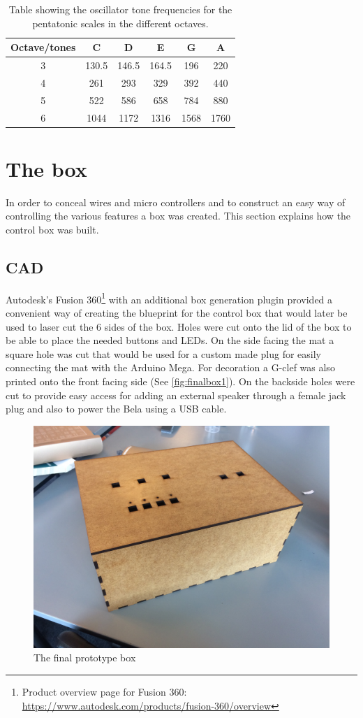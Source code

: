 	\begin{table}[H]
		\centering
		\caption{Table showing the oscillator tone frequencies for the pentatonic scales in the different octaves.}
		\label{tab:toneFreq}
		\begin{tabular}{|c|c|c|c|c|c|}
			\hline
			Octave/tones & C     & D     & E     & G    & A    \\ \hline
			3            & 130.5 & 146.5 & 164.5 & 196  & 220  \\ \hline
			4            & 261   & 293   & 329   & 392  & 440  \\ \hline
			5            & 522   & 586   & 658   & 784  & 880  \\ \hline
			6            & 1044  & 1172  & 1316  & 1568 & 1760 \\ \hline
		\end{tabular}
	\end{table}
	



\section{The box}%
In order to conceal wires and micro controllers and to construct an easy way of controlling the various features a box was created. This section explains how the control box was built.

	\subsection{CAD}
	Autodesk's Fusion 360\footnote{Product overview page for Fusion 360: \url{https://www.autodesk.com/products/fusion-360/overview}} with an additional box generation plugin provided a convenient way of creating the blueprint for the control box that would later be used to laser cut the 6 sides of the box. Holes were cut onto the lid of the box to be able to place the needed buttons and LEDs. On the side facing the mat a square hole was cut that would be used for a custom made plug for easily connecting the mat with the Arduino Mega. For decoration a G-clef was also printed onto the front facing side (See \autoref{fig:finalbox1}). On the backside holes were cut to provide easy access for adding an external speaker through a female jack plug and also to power the Bela using a USB cable.
	
	
	\begin{figure}[H]
		\centering
		\includegraphics[width=0.7\linewidth]{figure/Design/finalbox1}
		\caption{The final prototype box}	
		\label{fig:finalbox1}
	\end{figure}
	
